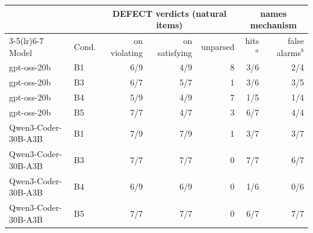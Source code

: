 \begin{tabular}{@{}l l rrr rr@{}}\toprule
 & & \multicolumn{3}{c}{DEFECT verdicts (natural items)} & \multicolumn{2}{c}{names mechanism} \\
\cmidrule(lr){3-5}\cmidrule(lr){6-7}
Model & Cond. & on violating & on satisfying & unparsed & hits$^{a}$ & false alarms$^{b}$ \\ \midrule
gpt-oss-20b & B1 & 6/9 & 4/9 & 8 & 3/6 & 2/4 \\
gpt-oss-20b & B3 & 6/7 & 5/7 & 1 & 3/6 & 3/5 \\
gpt-oss-20b & B4 & 5/9 & 4/9 & 7 & 1/5 & 1/4 \\
gpt-oss-20b & B5 & 7/7 & 4/7 & 3 & 6/7 & 4/4 \\
\midrule
Qwen3-Coder-30B-A3B & B1 & 7/9 & 7/9 & 1 & 3/7 & 3/7 \\
Qwen3-Coder-30B-A3B & B3 & 7/7 & 7/7 & 0 & 7/7 & 6/7 \\
Qwen3-Coder-30B-A3B & B4 & 6/9 & 6/9 & 0 & 1/6 & 0/6 \\
Qwen3-Coder-30B-A3B & B5 & 7/7 & 7/7 & 0 & 6/7 & 7/7 \\
\bottomrule\end{tabular}